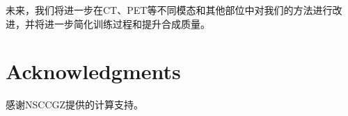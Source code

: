 \documentclass[letterpaper]{article} %
\begin{document}
未来，我们将进一步在CT、PET等不同模态和其他部位中对我们的方法进行改进，并将进一步简化训练过程和提升合成质量。	

\section{ Acknowledgments}
感谢NSCCGZ提供的计算支持。




\end{document}
